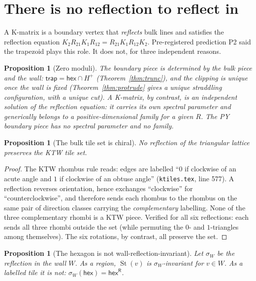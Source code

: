 \documentclass[11pt]{article}
\newtheorem{proposition}[theorem]{Proposition}
\theoremstyle{definition}
\newcommand{\hex}{\mathsf{hex}}
\newcommand{\hexR}{\mathsf{hex}^{\mathsf{R}}}
\newcommand{\trap}{\mathsf{trap}}
\newcommand{\Star}{\operatorname{St}}
\begin{document}
\section{There is no reflection to reflect in}\label{sec:refl}

A K-matrix is a boundary vertex that \emph{reflects} bulk lines and satisfies the
reflection equation
$K_2 R_{21} K_1 R_{12} = R_{21} K_1 R_{12} K_2$. Pre-registered prediction P2
said the trapezoid plays this role. It does not, for three independent reasons.

\begin{proposition}[Zero moduli]\label{prop:moduli}
The boundary piece is determined by the bulk piece and the wall:
$\trap = \hex\cap H^{+}$ (Theorem~\ref{thm:trunc}), and the clipping is unique
once the wall is fixed (Theorem~\ref{thm:protrude} gives a unique straddling
configuration, with a unique cut). A K-matrix, by contrast, is an
\emph{independent} solution of the reflection equation: it carries its own
spectral parameter and generically belongs to a positive-dimensional family for
a given $R$. The PY boundary piece has no spectral parameter and no family.
\end{proposition}

\begin{proposition}[The bulk tile set is chiral]\label{prop:chiral}
No reflection of the triangular lattice preserves the KTW tile set.
\end{proposition}

\begin{proof}
The KTW rhombus rule reads: edges are labelled ``$0$ if clockwise of an acute
angle and $1$ if clockwise of an obtuse angle'' (\texttt{ktiles.tex}, line 577).
A reflection reverses orientation, hence exchanges ``clockwise'' for
``counterclockwise'', and therefore sends each rhombus to the rhombus on the
same pair of direction classes carrying the \emph{complementary} labelling. None
of the three complementary rhombi is a KTW piece. Verified for all six
reflections: each sends all three rhombi outside the set (while permuting the
$0$- and $1$-triangles among themselves). The six rotations, by contrast, all
preserve the set.
\end{proof}

\begin{proposition}[The hexagon is not wall-reflection-invariant]\label{prop:notinv}
Let $\sigma_W$ be the reflection in the wall $W$. As a \emph{region},
$\Star(v)$ is $\sigma_W$-invariant for $v\in W$. As a \emph{labelled tile} it is
not: $\sigma_W(\hex)=\hexR$.
\end{proposition}
\end{document}
